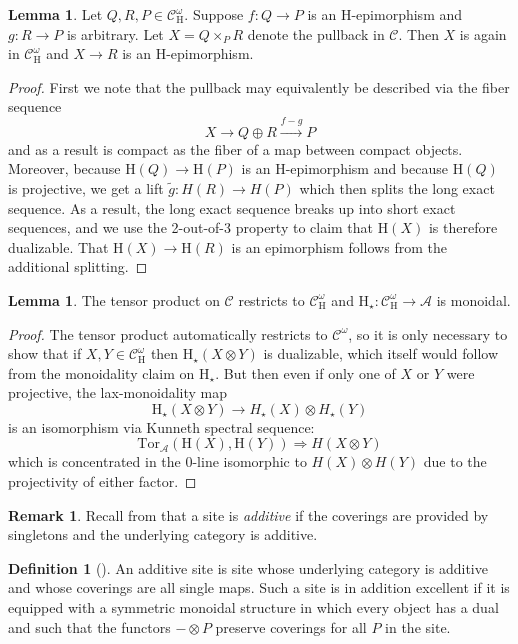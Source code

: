 \documentclass[10pt]{amsart}
\theoremstyle{definition}
\numberwithin{figure}{section}
\numberwithin{equation}{section}
\newtheorem{lemma}[figure]{Lemma}
\newtheorem{definition}[figure]{Definition}
\newtheorem{remark}[figure]{Remark}
\newcommand{\cA}{\mathcal{A}}
\newcommand{\cC}{\mathcal{C}}
\theoremstyle{cited}
\renewcommand{\H}{\mathrm{H}}
\newcommand{\Tor}{\mathrm{Tor}}
\begin{document}
\begin{lemma}
  \label{lem:sitepullbacks}
  Let $Q,R,P\in \cC^\omega_\H$. Suppose $f:Q\to P$ is an $\H$-epimorphism and $g:R\to P$ is arbitrary. Let $X=Q\times_P R$ denote the pullback in $\cC$. Then $X$ is again in $\cC^\omega_\H$ and $X\to R$ is an $\H$-epimorphism.
\end{lemma}

\begin{proof}
  First we note that the pullback may equivalently be described via the fiber sequence
  \[
  X\to Q\oplus R \xrightarrow{f-g} P
  \]
  and as a result is compact as the fiber of a map between compact objects. Moreover, because $\H(Q)\to \H(P)$ is an $\H$-epimorphism and because $\H(Q)$ is projective, we get a lift $\tilde g:H(R)\to H(P)$ which then splits the long exact sequence. As a result, the long exact sequence breaks up into short exact sequences, and we use the 2-out-of-3 property to claim that $\H(X)$ is therefore dualizable. That $\H(X)\to \H(R)$ is an epimorphism follows from the additional splitting.
\end{proof}

\begin{lemma}
  \label{lem:sitetensors}
The tensor product on $\cC$ restricts to $\cC^\omega_{\H}$ and $\H_\star:\cC^\omega_\H\to \cA$ is monoidal.
\end{lemma}

\begin{proof}
  The tensor product automatically restricts to $\cC^\omega$, so it is only necessary to show that if $X,Y\in \cC^\omega_\H$ then $\H_\star(X\otimes Y)$ is dualizable, which itself would follow from the monoidality claim on $\H_\star$. But then even if only one of $X$ or $Y$ were projective, the lax-monoidality map
  \[
  \H_\star(X\otimes Y)\to H_\star(X)\otimes H_\star(Y)
  \]
  is an isomorphism via Kunneth spectral sequence:
  \[
  \Tor_{\cA}(\H(X),\H(Y))\Rightarrow H(X\otimes Y)
  \]
  which is concentrated in the $0$-line isomorphic to $H(X)\otimes H(Y)$ due to the projectivity of either factor.
\end{proof}

\begin{remark}
  Recall from \cite{Pst22} that a site is \textit{additive} if the coverings are provided by singletons and the underlying category is additive. 
\end{remark}

\begin{definition}[\cite{Pst22}]
  An additive site is site whose underlying category is additive and whose coverings are all single maps. Such a site is in addition excellent if it is equipped with a symmetric monoidal structure in which every object has a dual and such that the functors $-\otimes P$ preserve coverings for all $P$ in the site.
\end{definition}
\end{document}
